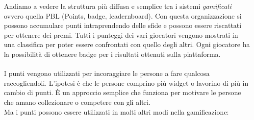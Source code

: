 Andiamo a vedere la struttura più diffusa e semplice tra i sistemi \textit{gamificati} ovvero quella PBL (Points, badge, leadernboard). Con questa organizzazione si possono accumulare punti intraprendendo delle sfide e possono essere riscattati per ottenere dei premi. Tutti i punteggi dei vari giocatori vengono mostrati in una classifica per poter essere confrontati con quello degli altri. Ogni giocatore ha la possibilità di ottenere badge per i risultati ottenuti sulla piattaforma. \\
\\
I punti vengono utilizzati per incoraggiare le persone a fare qualcosa raccogliendoli.
L'ipotesi è che le persone comprino più widget o lavorino di più in cambio di punti.
È un approccio semplice che funziona per motivare le persone che amano collezionare o competere con gli altri.
\\
Ma i punti possono essere utilizzati in molti altri modi nella gamificazione:
